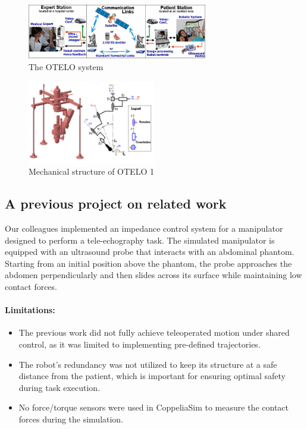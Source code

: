 \documentclass{article}
\begin{document}
\begin{figure}[h]
    \centering
    \includegraphics[width=0.7\textwidth]{OTELO.png}  
    \caption{The OTELO system}
    \label{fig:otelo}
\end{figure}


\begin{figure}[h]
    \centering
    \includegraphics[width=0.5\textwidth]{OTELO_structure.png}  
    \caption{Mechanical structure of OTELO 1}
    \label{fig:otelo struc}
\end{figure}

\subsection{A previous project on related work}
Our colleagues implemented an impedance control system for a manipulator designed to perform a tele-echography task. The simulated manipulator is equipped with an ultrasound probe that interacts with an abdominal phantom. Starting from an initial position above the phantom, the probe approaches the abdomen perpendicularly and then slides across its surface while maintaining low contact forces.

\paragraph{Limitations:}
\begin{itemize}
\item The previous work did not fully achieve teleoperated motion under shared control, as it was limited to implementing pre-defined trajectories.
\item The robot's redundancy was not utilized to keep its structure at a safe distance from the patient, which is important for ensuring optimal safety during task execution.
\item No force/torque sensors were used in CoppeliaSim to measure the contact forces during the simulation.
\end{itemize}
\par
\end{document}
